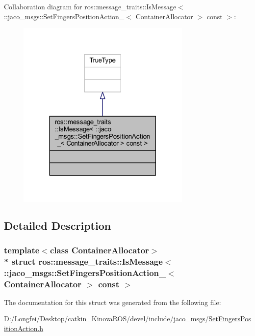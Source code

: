 Collaboration diagram for ros\+:\+:message\+\_\+traits\+:\+:Is\+Message$<$ \+:\+:jaco\+\_\+msgs\+:\+:Set\+Fingers\+Position\+Action\+\_\+$<$ Container\+Allocator $>$ const $>$\+:
\nopagebreak
\begin{figure}[H]
\begin{center}
\leavevmode
\includegraphics[width=242pt]{d8/df5/structros_1_1message__traits_1_1IsMessage_3_01_1_1jaco__msgs_1_1SetFingersPositionAction___3_01Cbb054942dcbd41a7f2eb094d49b40c99}
\end{center}
\end{figure}


\subsection{Detailed Description}
\subsubsection*{template$<$class Container\+Allocator$>$\\*
struct ros\+::message\+\_\+traits\+::\+Is\+Message$<$ \+::jaco\+\_\+msgs\+::\+Set\+Fingers\+Position\+Action\+\_\+$<$ Container\+Allocator $>$ const  $>$}



The documentation for this struct was generated from the following file\+:\begin{DoxyCompactItemize}
\item 
D\+:/\+Longfei/\+Desktop/catkin\+\_\+\+Kinova\+R\+O\+S/devel/include/jaco\+\_\+msgs/\hyperlink{SetFingersPositionAction_8h}{Set\+Fingers\+Position\+Action.\+h}\end{DoxyCompactItemize}

